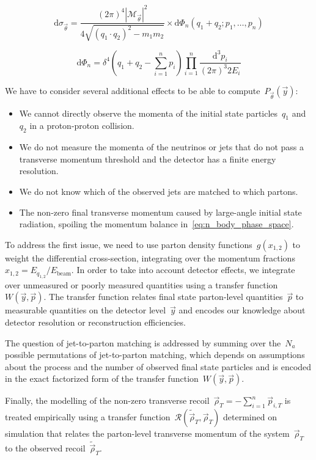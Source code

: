 \begin{equation}
\label{eq:diff_cross_section}
\mathrm{d}\sigma_{\vec{\theta}} = \frac{(2\pi)^4 |\mathcal{M}_{\vec{\theta}}|^2}{4 \sqrt{(q_1 \cdot q_2)^2 - m_1 m_2}} \times
\mathrm{d}\Phi_n(q_1 + q_2; p_1, \dots, p_{n})
\end{equation}

\begin{equation}
\label{eq:n_body_phase_space}
\mathrm{d}\Phi_n = \delta^4 (q_1 + q_2 - \sum_{i=1}^n p_i) \prod_{i=1}^n \frac{\mathrm{d}^3 p_i}{(2\pi)^3 2 E_i}
\end{equation}

We have to consider several additional effects to be able to compute~$P_{\vec{\theta}}(\vec{y})$:
\begin{itemize}
\item We cannot directly observe the momenta of the initial state particles~$q_1$ and~$q_2$ in a proton-proton collision.
\item We do not measure the momenta of the neutrinos or jets that do not pass a transverse momentum threshold and the detector has a finite energy resolution.
\item We do not know which of the observed jets are matched to which partons.
\item The non-zero final transverse momentum caused by large-angle initial state radiation, spoiling the momentum balance in~\cref{eq:n_body_phase_space}.
\end{itemize}

To address the first issue, we need to use parton density functions~$g(x_{1,2})$ to weight the differential cross-section, integrating over the momentum fractions~$x_{1,2} = E_{q_{1,2}}/E_{\mathrm{beam}}$.
In order to take into account detector effects, we integrate over unmeasured or poorly measured quantities using a transfer function~$W(\vec{y}, \vec{p})$.
The transfer function relates final state parton-level quantities~$\vec{p}$ to measurable quantities on the detector level~$\vec{y}$ and encodes our knowledge about detector resolution or reconstruction efficiencies.

The question of jet-to-parton matching is addressed by summing over the~$N_a$ possible permutations of jet-to-parton matching, which depends on assumptions about the process and the number of observed final state particles and is encoded in the exact factorized form of the transfer function~$W(\vec{y}, \vec{p})$.

Finally, the modelling of the non-zero transverse recoil~$\vec{\rho}_T = -\sum_{i=1}^n \vec{p}_{i,T}$ is treated empirically using a transfer function~$\mathcal{R}(\tilde{\vec{\rho}}_T, \vec{\rho}_T)$ determined on simulation that relates the parton-level transverse momentum of the system~$\vec{\rho}_T$ to the observed recoil~$\tilde{\vec{\rho}}_T$. 

